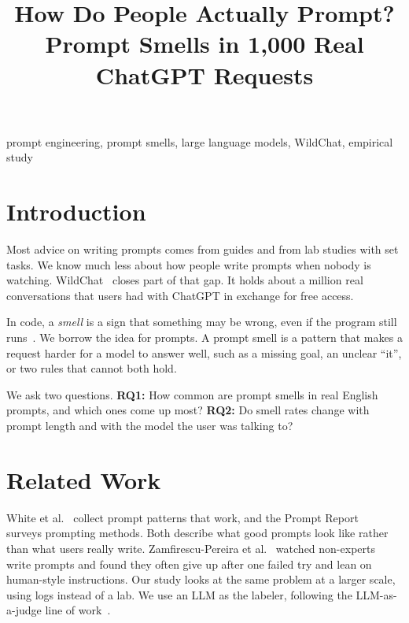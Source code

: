 \documentclass[conference]{IEEEtran}
\begin{document}
\title{How Do People Actually Prompt? Prompt Smells in 1,000 Real ChatGPT Requests}

\author{
}

\maketitle

\begin{abstract}
\end{abstract}

\begin{IEEEkeywords}
prompt engineering, prompt smells, large language models, WildChat, empirical study
\end{IEEEkeywords}

\section{Introduction}
Most advice on writing prompts comes from guides and from lab studies with set tasks.
We know much less about how people write prompts when nobody is watching.
WildChat~\cite{wildchat} closes part of that gap. It holds about a million real
conversations that users had with ChatGPT in exchange for free access.

In code, a \emph{smell} is a sign that something may be wrong, even if the program
still runs~\cite{fowler}. We borrow the idea for prompts. A prompt smell is a
pattern that makes a request harder for a model to answer well, such as a missing
goal, an unclear ``it'', or two rules that cannot both hold.

We ask two questions.
\textbf{RQ1:} How common are prompt smells in real English prompts, and which ones
come up most?
\textbf{RQ2:} Do smell rates change with prompt length and with the model the user
was talking to?


\section{Related Work}
White et al.~\cite{white} collect prompt patterns that work, and the Prompt
Report~\cite{promptreport} surveys prompting methods. Both describe what good
prompts look like rather than what users really write. Zamfirescu-Pereira
et al.~\cite{johnny} watched non-experts write prompts and found they often
give up after one failed try and lean on human-style instructions. Our study looks
at the same problem at a larger scale, using logs instead of a lab. We use an
LLM as the labeler, following the LLM-as-a-judge line of work~\cite{judge}.
\end{document}
